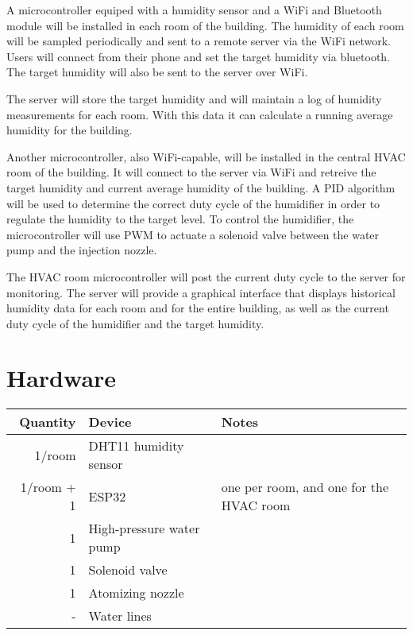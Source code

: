 \documentclass[11pt]{article}
\begin{document}
A microcontroller equiped with a humidity sensor and a WiFi and Bluetooth module will be installed in each room of the building.
The humidity of each room will be sampled periodically and sent to a remote server via the WiFi network.
Users will connect from their phone and set the target humidity via bluetooth.
The target humidity will also be sent to the server over WiFi.

The server will store the target humidity and will maintain a log of humidity measurements for each room.
With this data it can calculate a running average humidity for the building.

Another microcontroller, also WiFi-capable, will be installed in the central HVAC room of the building.
It will connect to the server via WiFi and retreive the target humidity and current average humidity of the building.
A PID algorithm will be used to determine the correct duty cycle of the humidifier in order to regulate the humidity to the target level.
To control the humidifier, the microcontroller will use PWM to actuate a solenoid valve between the water pump and the injection nozzle.

The HVAC room microcontroller will post the current duty cycle to the server for monitoring.
The server will provide a graphical interface that displays historical humidity data for each room and for the entire building, as well as the current duty cycle of the humidifier and the  target humidity.


\section{Hardware}

\begin{tabularx}{\textwidth}{r X X}
	\hline
	Quantity & Device & Notes \\
	\hline
	1/room & DHT11 humidity sensor \\
	1/room + 1 & ESP32 & one per room, and one for the HVAC room \\
	1 & High-pressure water pump \\
	1 & Solenoid valve \\
	1 & Atomizing nozzle \\
	 - & Water lines \\
	\hline
\end{tabularx}

\printbibliography
\end{document}
